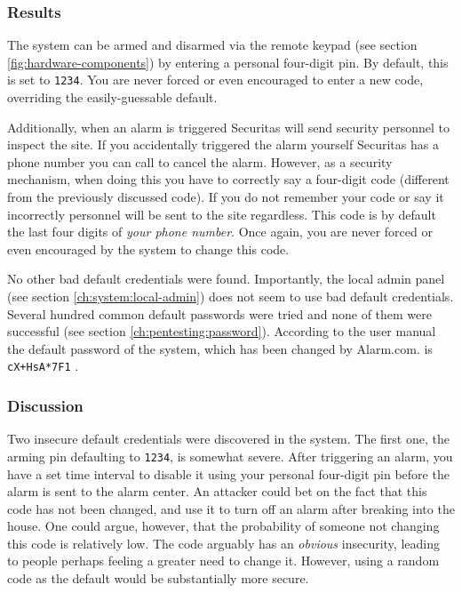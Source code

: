 \subsubsection{Results}
The system can be armed and disarmed via the remote keypad (see section \ref{fig:hardware-components}) by entering a personal four-digit pin. By default, this is set to \texttt{1234}. You are never forced or even encouraged to enter a new code, overriding the easily-guessable default.

Additionally, when an alarm is triggered Securitas will send security personnel to inspect the site. If you accidentally triggered the alarm yourself Securitas has a phone number you can call to cancel the alarm. However, as a security mechanism, when doing this you have to correctly say a four-digit code (different from the previously discussed code). If you do not remember your code or say it incorrectly personnel will be sent to the site regardless. This code is by default the last four digits of \textit{your phone number}. Once again, you are never forced or even encouraged by the system to change this code.

No other bad default credentials were found. Importantly, the local admin panel (see section \ref{ch:system:local-admin}) does not seem to use bad default credentials. Several hundred common default passwords were tried and none of them were successful (see section \ref{ch:pentesting:password}). According to the user manual the default password of the system, which has been changed by Alarm.com. is \texttt{cX+HsA*7F1} \cite{hsgw-user-manual}.

\subsubsection{Discussion}
Two insecure default credentials were discovered in the system. The first one, the arming pin defaulting to \texttt{1234}, is somewhat severe. After triggering an alarm, you have a set time interval to disable it using your personal four-digit pin before the alarm is sent to the alarm center. An attacker could bet on the fact that this code has not been changed, and use it to turn off an alarm after breaking into the house. One could argue, however, that the probability of someone not changing this code is relatively low. The code arguably has an \textit{obvious} insecurity, leading to people perhaps feeling a greater need to change it. However, using a random code as the default would be substantially more secure.

